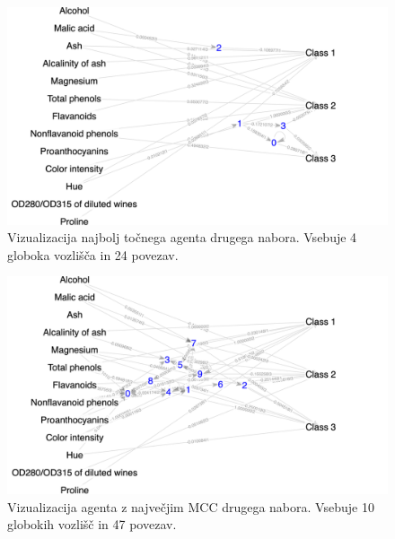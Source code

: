 \begin{figure}[H]
    \begin{center}
        \includegraphics[width=13cm]{wine/2/acc_g}
    \end{center}
    \caption{Vizualizacija najbolj točnega agenta drugega nabora. Vsebuje 4 globoka vozlišča in 24 povezav.}
    \label{fig:wine_acc_2_g}
\end{figure}

\begin{figure}[H]
    \begin{center}
        \includegraphics[width=13cm]{wine/2/mcc_g}
    \end{center}
    \caption{Vizualizacija agenta z največjim MCC drugega nabora. Vsebuje 10 globokih vozlišč in 47 povezav.}
    \label{fig:wine_mcc_2_g}
\end{figure}

